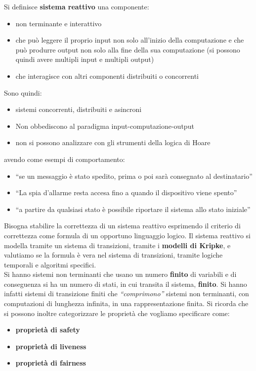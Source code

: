 \documentclass[a4paper,12pt, oneside]{book}
\begin{document}
\begin{definizione}
  Si definisce \textbf{sistema reattivo} una componente:
  \begin{itemize}
    \item non terminante e interattivo
    \item che può leggere il proprio input non solo all'inizio della
    computazione e che può produrre output non solo alla fine della sua
    computazione (si possono quindi avere multipli input e multipli output)
    \item che interagisce con altri componenti distribuiti o concorrenti
  \end{itemize}
  Sono quindi:
  \begin{itemize}
    \item sistemi concorrenti, distribuiti e asincroni
    \item Non obbediscono al paradigma input-computazione-output
    \item non si possono analizzare con gli strumenti della logica di Hoare
  \end{itemize}
  avendo come esempi di comportamento:
  \begin{itemize}
    \item ``se un messaggio è stato spedito, prima o poi sarà consegnato al
    destinatario''
    \item ``La spia d’allarme resta accesa fino a quando il dispositivo viene
    spento'' 
    \item ``a partire da qualsiasi stato è possibile riportare il sistema allo
    stato iniziale''
  \end{itemize}
\end{definizione}
Bisogna stabilire la correttezza di un sistema reattivo esprimendo il criterio
di correttezza come formula di un opportuno linguaggio logico. Il sistema
reattivo si modella tramite un sistema di transizioni, tramite i \textbf{modelli
di Kripke}, e valutiamo se la formula è vera nel sistema di transizioni, tramite
logiche temporali e algoritmi specifici.\\
Si hanno sistemi non terminanti che usano un numero \textbf{finito} di
variabili e di conseguenza si ha un numero di stati, in cui transita il sistema,
\textbf{finito}. Si hanno infatti sistemi di transizione finiti che
\textit{``comprimono''} sistemi non terminanti, con computazioni di lunghezza
infinita, in una rappresentazione finita.
Si ricorda che si possono inoltre categorizzare le proprietà che vogliamo
specificare come: 
\begin{itemize}
  \item \textbf{proprietà di safety}
  \item \textbf{proprietà di liveness}
  \item \textbf{proprietà di fairness}
\end{itemize}
\end{document}
